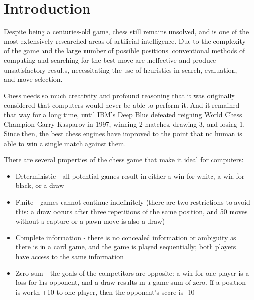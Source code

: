 \chapter{Introduction}
\label{intro}


Despite being a centuries-old game, chess still remains unsolved, and is one of the most extensively researched areas of artificial intelligence. Due to the complexity of the game and the large number of possible positions, conventional methods of computing and searching for the best move are ineffective and produce unsatisfactory results, necessitating the use of heuristics in search, evaluation, and move selection.

Chess needs so much creativity and profound reasoning that it was originally considered that computers would never be able to perform it. And it remained that way for a long time, until IBM's Deep Blue \cite{campbell2002deep} defeated reigning World Chess Champion Garry Kasparov in 1997, winning 2 matches, drawing 3, and losing 1. Since then, the best chess engines have improved to the point that no human is able to win a single match against them.


There are several properties of the chess game that make it ideal for computers:
\begin{itemize}
    \item Deterministic - all potential games result in either a win for white, a win for black, or a draw
    \item Finite - games cannot continue indefinitely (there are two restrictions to avoid this: a draw occurs after three repetitions of the same position, and 50 moves without a capture or a pawn move is also a draw)
    \item Complete information - there is no concealed information or ambiguity as there is in a card game, and the game is played sequentially; both players have access to the same information
    \item Zero-sum - the goals of the competitors are opposite: a win for one player is a loss for his opponent, and a draw results in a game sum of zero. If a position is worth +10 to one player, then the opponent's score is -10
\end{itemize}

